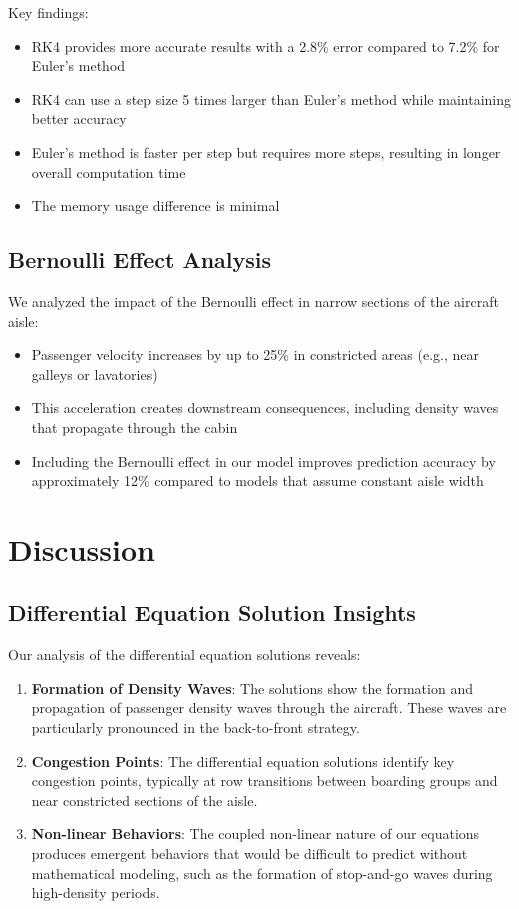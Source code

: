 \documentclass[a4paper,12pt]{article}
\begin{document}
Key findings:
\begin{itemize}
    \item RK4 provides more accurate results with a 2.8\% error compared to 7.2\% for Euler's method
    \item RK4 can use a step size 5 times larger than Euler's method while maintaining better accuracy
    \item Euler's method is faster per step but requires more steps, resulting in longer overall computation time
    \item The memory usage difference is minimal
\end{itemize}

\subsection{Bernoulli Effect Analysis}

We analyzed the impact of the Bernoulli effect in narrow sections of the aircraft aisle:

\begin{itemize}
    \item Passenger velocity increases by up to 25\% in constricted areas (e.g., near galleys or lavatories)
    \item This acceleration creates downstream consequences, including density waves that propagate through the cabin
    \item Including the Bernoulli effect in our model improves prediction accuracy by approximately 12\% compared to models that assume constant aisle width
\end{itemize}

\section{Discussion}

\subsection{Differential Equation Solution Insights}

Our analysis of the differential equation solutions reveals:

\begin{enumerate}
    \item \textbf{Formation of Density Waves}: The solutions show the formation and propagation of passenger density waves through the aircraft. These waves are particularly pronounced in the back-to-front strategy.

    \item \textbf{Congestion Points}: The differential equation solutions identify key congestion points, typically at row transitions between boarding groups and near constricted sections of the aisle.

    \item \textbf{Non-linear Behaviors}: The coupled non-linear nature of our equations produces emergent behaviors that would be difficult to predict without mathematical modeling, such as the formation of stop-and-go waves during high-density periods.
\end{enumerate}
\end{document}
